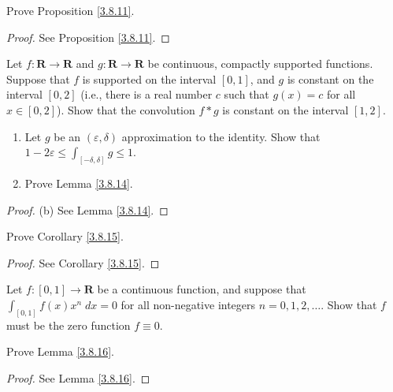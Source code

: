 \begin{exercise}\label{ex 3.8.4}
    Prove Proposition \ref{3.8.11}.
\end{exercise}

\begin{proof}
    See Proposition \ref{3.8.11}.
\end{proof}

\begin{exercise}\label{ex 3.8.5}
    Let \(f : \mathbf{R} \to \mathbf{R}\) and \(g : \mathbf{R} \to \mathbf{R}\) be continuous, compactly supported functions.
    Suppose that \(f\) is supported on the interval \([0, 1]\), and \(g\) is constant on the interval \([0, 2]\)
    (i.e., there is a real number \(c\) such that \(g(x) = c\) for all \(x \in [0, 2]\)).
    Show that the convolution \(f * g\) is constant on the interval \([1, 2]\).
\end{exercise}

\begin{exercise}\label{ex 3.8.6}
    \quad
    \begin{enumerate}
        \item Let \(g\) be an \((\varepsilon, \delta)\) approximation to the identity.
              Show that \(1 - 2 \varepsilon \leq \int_{[-\delta, \delta]} g \leq 1\).
        \item Prove Lemma \ref{3.8.14}.
    \end{enumerate}
\end{exercise}

\begin{proof}{(b)}
    See Lemma \ref{3.8.14}.
\end{proof}

\begin{exercise}\label{ex 3.8.7}
    Prove Corollary \ref{3.8.15}.
\end{exercise}

\begin{proof}
    See Corollary \ref{3.8.15}.
\end{proof}

\begin{exercise}\label{ex 3.8.8}
    Let \(f : [0, 1] \to \mathbf{R}\) be a continuous function, and suppose that \(\int_{[0, 1]} f(x) x^n \; dx = 0\) for all non-negative integers \(n = 0, 1, 2, \dots\).
    Show that \(f\) must be the zero function \(f \equiv 0\).
\end{exercise}

\begin{exercise}\label{ex 3.8.9}
    Prove Lemma \ref{3.8.16}.
\end{exercise}

\begin{proof}
    See Lemma \ref{3.8.16}.
\end{proof}